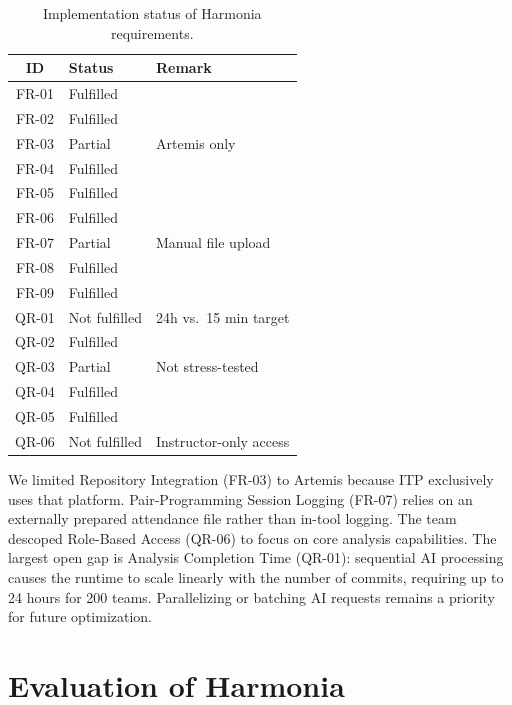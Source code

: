 \documentclass[sigconf]{acmart}
\begin{document}
\begin{table}[h]
  \caption{Implementation status of Harmonia requirements.}
  \label{tab:implementation-status}
  \begin{tabular}{cll}
    \toprule
    \textbf{ID} & \textbf{Status} & \textbf{Remark} \\
    \midrule
    FR-01 & Fulfilled & \\
    FR-02 & Fulfilled & \\
    FR-03 & Partial & Artemis only \\
    FR-04 & Fulfilled & \\
    FR-05 & Fulfilled & \\
    FR-06 & Fulfilled & \\
    FR-07 & Partial & Manual file upload \\
    FR-08 & Fulfilled & \\
    FR-09 & Fulfilled & \\
    \midrule
    QR-01 & Not fulfilled & 24h vs.\ 15 min target \\
    QR-02 & Fulfilled & \\
    QR-03 & Partial & Not stress-tested \\
    QR-04 & Fulfilled & \\
    QR-05 & Fulfilled & \\
    QR-06 & Not fulfilled & Instructor-only access \\
    \bottomrule
  \end{tabular}
\end{table}

We limited Repository Integration (FR-03) to Artemis because ITP exclusively uses that platform. Pair-Programming Session Logging (FR-07) relies on an externally prepared attendance file rather than in-tool logging. The team descoped Role-Based Access (QR-06) to focus on core analysis capabilities. The largest open gap is Analysis Completion Time (QR-01): sequential AI processing causes the runtime to scale linearly with the number of commits, requiring up to 24 hours for 200 teams. Parallelizing or batching AI requests remains a priority for future optimization.

\section{Evaluation of Harmonia}
\end{document}
